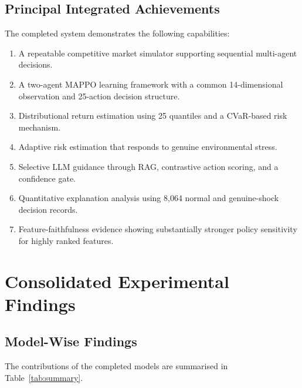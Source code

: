 \documentclass[conference]{IEEEtran}
\begin{document}
\subsection{Principal Integrated Achievements}
The completed system demonstrates the following capabilities:
\begin{enumerate}
  \item A repeatable competitive market simulator supporting sequential multi-agent decisions.
  \item A two-agent MAPPO learning framework with a common 14-dimensional observation and 25-action decision structure.
  \item Distributional return estimation using 25 quantiles and a CVaR-based risk mechanism.
  \item Adaptive risk estimation that responds to genuine environmental stress.
  \item Selective LLM guidance through RAG, contrastive action scoring, and a confidence gate.
  \item Quantitative explanation analysis using 8,064 normal and genuine-shock decision records.
  \item Feature-faithfulness evidence showing substantially stronger policy sensitivity for highly ranked features.
\end{enumerate}

\section{Consolidated Experimental Findings}

\subsection{Model-Wise Findings}
The contributions of the completed models are summarised in Table~\ref{tab:summary}.
\end{document}
